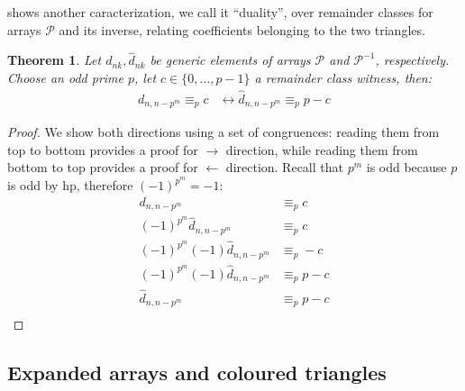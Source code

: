 \documentclass[10pt,a4paper]{article} %
\newtheorem{theorem}{Theorem}[section]
\begin{document}
    shows another caracterization, we call it ``duality'', 
    over remainder classes for arrays $\mathcal{P}$ and its inverse, relating coefficients
    belonging to the two triangles.
    \begin{theorem}
        Let $d_{nk}, \hat{d}_{nk}$ be generic elements of arrays $\mathcal{P}$ and $\mathcal{P}^{-1}$,
        respectively. Choose an odd prime $p$, let $c\in \lbrace 0, \ldots, p-1 \rbrace$ a remainder class
        witness, then:
        \begin{displaymath}
            \begin{split}
                d_{n,n-p^{m}} \equiv_{p} c &\leftrightarrow \hat{d}_{n,n-p^{m}} \equiv_{p} p-c
            \end{split}
        \end{displaymath}
    \end{theorem}
    \begin{proof}
    We show both directions using a set of congruences: reading them from top to bottom provides a 
    proof for $\rightarrow$ direction, while reading them from bottom to top provides a proof for 
    $\leftarrow$ direction. Recall that $p^m$ is odd because $p$ is odd by hp, therefore $(-1)^{p^m} = -1$:
    \begin{displaymath}
        \begin{split}
            d_{n,n-p^{m}} &\equiv_{p} c \\
            (-1)^{p^m}\hat{d}_{n,n-p^{m}} &\equiv_{p} c \\
            (-1)^{p^m }(-1)\hat{d}_{n,n-p^{m}} &\equiv_{p} -c \\
            (-1)^{p^m }(-1)\hat{d}_{n,n-p^{m}} &\equiv_{p} p -c \\
            \hat{d}_{n,n-p^{m}} &\equiv_{p} p -c \\
        \end{split}
    \end{displaymath}
    \end{proof}

    \subsection{Expanded arrays and coloured triangles}

    
    
\end{document}
